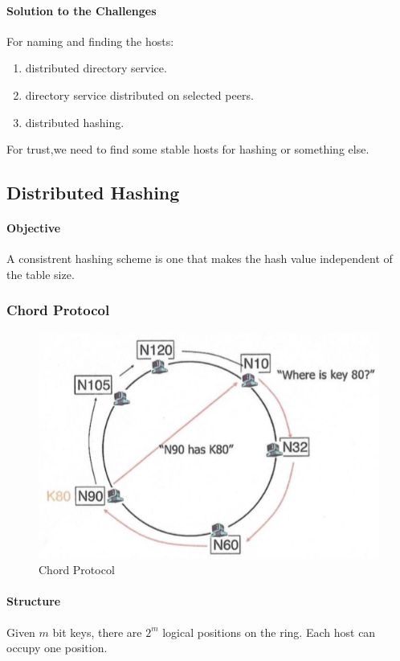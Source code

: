 \paragraph{Solution to the Challenges}
For naming and finding the hosts:
\begin{enumerate}
    \item distributed directory service.
    \item directory service distributed on selected peers.
    \item distributed hashing.
\end{enumerate}
For trust,we need to find some stable hosts for hashing or something else.

\subsection{Distributed Hashing}
\paragraph{Objective}
A consistrent hashing scheme is one that makes the hash value independent of the table size.
\subsubsection{Chord Protocol}

\begin{figure}
\centering
\includegraphics[width=\textwidth]{img/ch05-chord.png}
\caption{Chord Protocol}
\label{fig:ch05-chord}
\end{figure}

\paragraph{Structure}
Given $m$ bit keys, there are $2^m$ logical positions on the ring. Each host can occupy one position.

